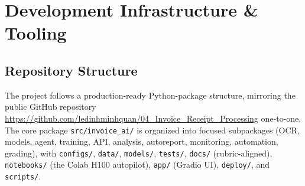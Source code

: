 \documentclass[12pt,a4paper]{article}
\begin{document}
\section{Development Infrastructure \& Tooling}

\subsection{Repository Structure}

The project follows a production-ready Python-package structure, mirroring the public
GitHub repository \url{https://github.com/ledinhminhquan/04_Invoice_Receipt_Processing}
one-to-one. The core package \texttt{src/invoice\_ai/} is organized into focused
subpackages (OCR, models, agent, training, API, analysis, autoreport, monitoring,
automation, grading), with \texttt{configs/}, \texttt{data/}, \texttt{models/},
\texttt{tests/}, \texttt{docs/} (rubric-aligned), \texttt{notebooks/} (the Colab H100
autopilot), \texttt{app/} (Gradio UI), \texttt{deploy/}, and \texttt{scripts/}.
\end{document}
